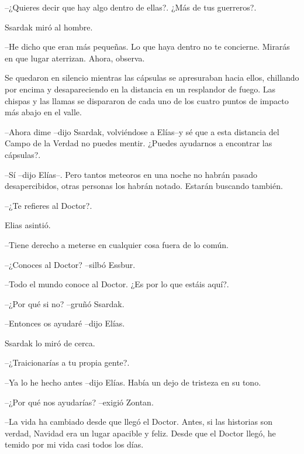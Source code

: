 --¿Quieres decir que hay algo dentro de ellas?. ¿Más de tus guerreros?.



Ssardak miró al hombre. 


--He dicho que eran más pequeñas. Lo que haya dentro no te concierne. Mirarás en que lugar aterrizan. Ahora, observa.



Se quedaron en silencio mientras las cápsulas se apresuraban hacia ellos, chillando por encima y desapareciendo en la distancia en un resplandor de fuego. Las chispas y las llamas se dispararon de cada uno de los cuatro puntos de impacto más abajo en el valle.



--Ahora dime --dijo Ssardak, volviéndose a Elías--y sé que a esta distancia del Campo de la Verdad no puedes mentir. ¿Puedes ayudarnos a encontrar las cápsulas?.



--Sí --dijo Elías--. Pero tantos meteoros en una noche no habrán pasado desapercibidos, otras personas los habrán notado. Estarán buscando también.



--¿Te refieres al Doctor?.



Elias asintió. 


--Tiene derecho a meterse en cualquier cosa fuera de lo común.



--¿Conoces al Doctor? --silbó Essbur.



--Todo el mundo conoce al Doctor. ¿Es por lo que estáis aquí?.



--¿Por qué si no? --gruñó Ssardak.



--Entonces os ayudaré --dijo Elías. 


Ssardak lo miró de cerca. 


--¿Traicionarías a tu propia gente?.


--Ya lo he hecho antes --dijo Elías. Había un dejo de tristeza en su tono.



--¿Por qué nos ayudarías? --exigió Zontan.



--La vida ha cambiado desde que llegó el Doctor. Antes, si las historias son verdad, Navidad era un lugar apacible y feliz. Desde que el Doctor llegó, he temido por mi vida casi todos los días. 



